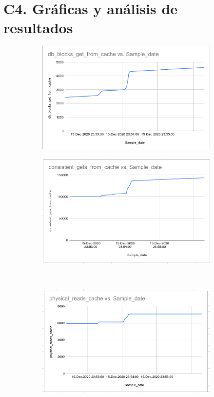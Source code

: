 \documentclass{article}
\begin{document}
\newpage

\section*{C4. Gráficas y análisis de resultados}

\begin{figure}[ht!]
  \begin{subfigure}{0.5\textwidth}
    \centering  
    \includegraphics[width=0.9\linewidth]{grafica01}
    \caption{}
  \end{subfigure} 
  \begin{subfigure}{0.5\textwidth}
    \centering  
    \includegraphics[width=0.9\linewidth]{grafica02}
    \caption{}
  \end{subfigure} 
  \newline
  \\[3mm]
  \begin{subfigure}{0.5\textwidth}
    \centering  
    \includegraphics[width=0.9\linewidth]{grafica03}

\end{subfigure}
\end{figure}
\end{document}
